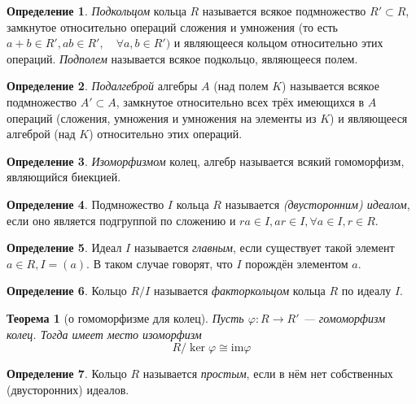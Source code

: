 \documentclass[a4paper]{article}
\theoremstyle{plain}
\newtheorem*{theorem}{Теорема}
\theoremstyle{definition}
\newtheorem{definition}{Определение}
\numberwithin{definition}{section}
\numberwithin{proposal}{section}
\newcommand{\im}{\mathrm{im}}
\begin{document}
\begin{definition}
\emph{Подкольцом} кольца \(R\) называется всякое подмножество \(R' \subset R\), замкнутое относительно операций сложения и умножения (то есть \(a + b \in R', ab \in R', \quad \forall a, b \in R')\) и являющееся кольцом относительно этих операций. \emph{Подполем} называется всякое подкольцо, являющееся полем.
\end{definition}

\begin{definition}
\emph{Подалгеброй} алгебры \(A\) (над полем \(K\)) называется всякое подмножество \(A' \subset A\), замкнутое относительно всех трёх имеющихся в \(A\) операций (сложения, умножения и умножения на элементы из \(K\)) и являющееся алгеброй (над \(K\)) относительно этих операций.
\end{definition}

\begin{definition}
\emph{Изоморфизмом} колец, алгебр называется всякий гомоморфизм, являющийся биекцией.
\end{definition}

\begin{definition}
Подмножество \(I\) кольца \(R\) называется \emph{(двусторонним) идеалом}, если оно является подгруппой по сложению и \(ra \in I, ar \in I, \forall a \in I, r \in R\).
\end{definition}

\begin{definition}
Идеал \(I\) называется \emph{главным}, если существует такой элемент \(a \in R, I = (a)\). В таком случае говорят, что \(I\) порождён элементом \(a\). 
\end{definition}

\begin{definition}
Кольцо \(R/I\) называется \emph{факторкольцом} кольца \(R\) по идеалу \(I\).
\end{definition}

\begin{theorem}[о гомоморфизме для колец]
Пусть \(\varphi: R \rightarrow R'\) --- гомоморфизм колец. Тогда имеет место изоморфизм
\begin{equation*}
	R / \ker \varphi \cong \im \varphi
\end{equation*}
\end{theorem}

\begin{definition}
Кольцо \(R\) называется \emph{простым}, если в нём нет собственных (двусторонних) идеалов.
\end{definition}
\end{document}
